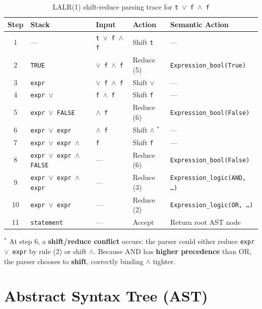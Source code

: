 \begin{table}[H]
\centering
\caption{LALR(1) shift-reduce parsing trace for \texttt{t $\vee$ f $\wedge$ f}}
\label{table:parse_trace}
\begin{tabular}{@{}clllp{4.5cm}@{}}
\toprule
Step & Stack & Input & Action & Semantic Action \\
\midrule
1  & ---                        & \texttt{t $\vee$ f $\wedge$ f} & Shift \texttt{t}     & --- \\
2  & \texttt{TRUE}              & \texttt{$\vee$ f $\wedge$ f}   & Reduce (5) & \texttt{Expression\_bool(True)} \\
3  & \texttt{expr}              & \texttt{$\vee$ f $\wedge$ f}   & Shift $\vee$       & --- \\
4  & \texttt{expr $\vee$}       & \texttt{f $\wedge$ f}          & Shift \texttt{f}     & --- \\
5  & \texttt{expr $\vee$ FALSE} & \texttt{$\wedge$ f}            & Reduce (6) & \texttt{Expression\_bool(False)} \\
6  & \texttt{expr $\vee$ expr}  & \texttt{$\wedge$ f}            & Shift $\wedge$ $^*$ & --- \\
7  & \texttt{expr $\vee$ expr $\wedge$} & \texttt{f}             & Shift \texttt{f}     & --- \\
8  & \texttt{expr $\vee$ expr $\wedge$ FALSE} & ---               & Reduce (6) & \texttt{Expression\_bool(False)} \\
9  & \texttt{expr $\vee$ expr $\wedge$ expr}  & ---               & Reduce (3) & \texttt{Expression\_logic(AND, \ldots)} \\
10 & \texttt{expr $\vee$ expr}  & ---                             & Reduce (2) & \texttt{Expression\_logic(OR, \ldots)} \\
11 & \texttt{statement}         & ---                             & Accept     & Return root AST node \\
\bottomrule
\end{tabular}
\end{table}

$^*$ At step 6, a \textbf{shift/reduce conflict} occurs: the parser could either reduce \texttt{expr $\vee$ expr} by rule (2) or shift $\wedge$. Because AND has \textbf{higher precedence} than OR, the parser chooses to \textbf{shift}, correctly binding $\wedge$ tighter.


\section{Abstract Syntax Tree (AST)}

